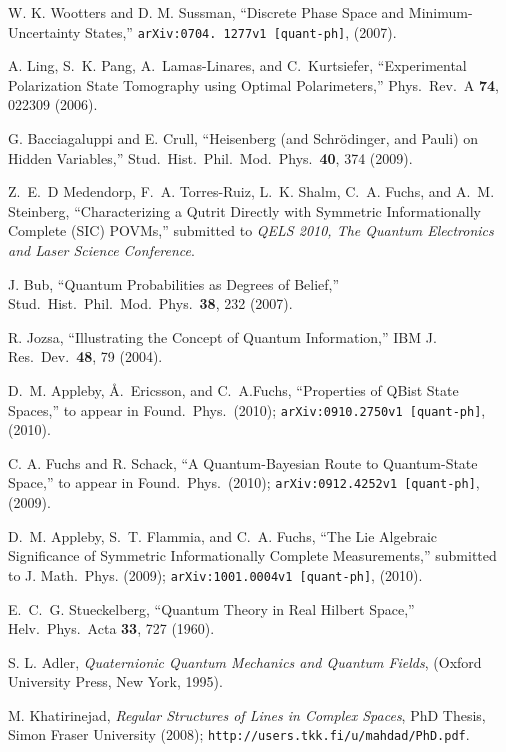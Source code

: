 \begin{thebibliography}{100}
W. K. Wootters and D. M. Sussman, ``Discrete Phase Space and Minimum-Uncertainty States,'' {\tt arXiv:0704. 1277v1 [quant-ph]}, (2007).

A. Ling, S.~K. Pang, A.~Lamas-Linares, and C.~Kurtsiefer, ``Experimental Polarization State Tomography using Optimal Polarimeters,'' Phys.\ Rev.\ A {\bf 74}, 022309 (2006).

G. Bacciagaluppi and E. Crull, ``Heisenberg (and Schr{\"o}dinger, and Pauli) on Hidden Variables,'' Stud.\ Hist.\ Phil.\ Mod.\ Phys.\ {\bf 40}, 374 (2009).

Z.~E.~D Medendorp, F.~A. Torres-Ruiz, L.~K. Shalm, C.~A. Fuchs, and A.~M. Steinberg, ``Characterizing a Qutrit Directly with Symmetric Informationally Complete (SIC) POVMs,'' submitted to {\sl QELS 2010, The Quantum Electronics and Laser Science Conference}.

J. Bub, ``Quantum Probabilities as Degrees of Belief,'' Stud.\ Hist.\ Phil.\ Mod.\ Phys.\ {\bf 38}, 232 (2007).

R. Jozsa, ``Illustrating the Concept of Quantum Information,'' IBM J. Res.\ Dev.\ {\bf 48}, 79 (2004).

D.~M. Appleby, {\AA}.~Ericsson, and C.~A.Fuchs, ``Properties of QBist State Spaces,'' to appear in Found.\ Phys.\ (2010); {\tt arXiv:0910.2750v1 [quant-ph]}, (2010).

C. A. Fuchs and R. Schack, ``A Quantum-Bayesian Route to Quantum-State Space,'' to appear in Found.\ Phys.\ (2010); {\tt arXiv:0912.4252v1 [quant-ph]}, (2009).

D.~M. Appleby, S.~T. Flammia, and C.~A. Fuchs, ``The Lie Algebraic Significance of Symmetric Informationally Complete Measurements,'' submitted to J. Math.\ Phys. (2009); {\tt arXiv:1001.0004v1 [quant-ph]}, (2010).

E.~C.~G. Stueckelberg, ``Quantum Theory in Real Hilbert Space,'' Helv.\ Phys.\ Acta {\bf 33}, 727 (1960).

S. L. Adler, {\sl Quaternionic Quantum Mechanics and Quantum Fields}, (Oxford University Press, New York, 1995).

M. Khatirinejad, {\sl Regular Structures of Lines in Complex Spaces}, PhD Thesis, Simon Fraser University (2008); {\tt http://users.tkk.fi/u/mahdad/PhD.pdf}.


\end{thebibliography}
